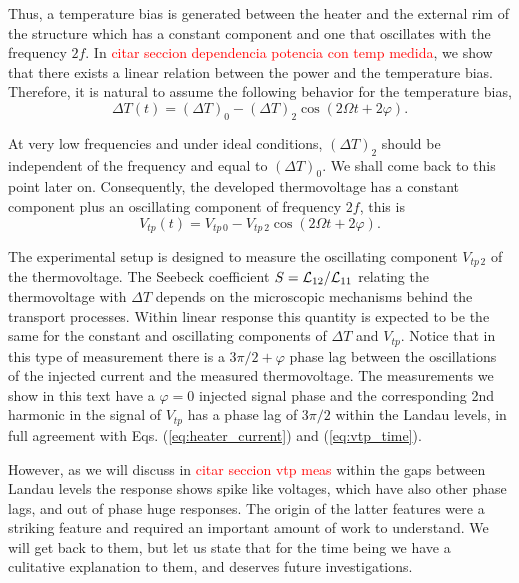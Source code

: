 Thus, a temperature bias is generated between the heater and the external rim of the structure which has a constant component and one that oscillates with the frequency $2 f$. 
In \textcolor{red}{citar seccion dependencia potencia con temp medida}, we show that there exists a linear relation between the power and the temperature bias. Therefore, it is natural to assume the following behavior for the temperature bias,
\begin{equation}
    \label{eq:deltaT_time}
    \Delta T (t) = (\Delta T)_0 - (\Delta T)_2 \cos (2 \Omega t + 2 \varphi).
\end{equation}

At very low frequencies and under ideal conditions, $(\Delta T)_2$ should be independent of the frequency and equal to $(\Delta T)_0$. We shall come back to this point later on. 
Consequently, the developed thermovoltage has a constant component plus an oscillating component of frequency $2f$, this is 
\begin{equation}
    \label{eq:vtp_time}
    V_{tp}(t)=V_{ tp \, 0} - V_{tp \, 2} \cos (2 \Omega t + 2 \varphi).
\end{equation}

The experimental setup is designed to measure the oscillating component $ V_{tp \, 2}$ of the thermovoltage. 
The Seebeck coefficient $ S={\cal L}_{12}/{\cal L}_{11} $ relating the thermovoltage with $ \Delta T $ depends on the microscopic mechanisms behind the transport processes. 
Within linear response this quantity is expected to be the same for the constant and oscillating components of $ \Delta T $ and $V_{tp}$. 
Notice that in this type of measurement there is a $3\pi/2+\varphi$ phase lag between the oscillations of the injected current and the measured thermovoltage. 
The measurements we show in this text have a $\varphi=0$ injected signal phase and the corresponding 2nd harmonic in the signal of $ V_{tp} $ has a phase lag of $3\pi/2$ within the Landau levels, in full agreement with Eqs. (\ref{eq:heater_current}) and (\ref{eq:vtp_time}). 

However, as we will discuss in \textcolor{red}{citar seccion vtp meas} within the gaps between Landau levels the response shows spike like voltages, which have also other phase lags, and out of phase huge responses. The origin of the latter features were a striking feature and required an important amount of work to understand. We will get back to them, but let us state that for the time being we have a culitative explanation to them, and deserves future investigations.

